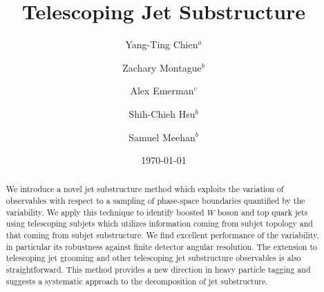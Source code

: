 \documentclass[aps,prl,floatfix,preprintnumbers,twocolumn,groupedaddress,nofootinbib]{revtex4-1}
\begin{document}
\title{Telescoping Jet Substructure}

\author{Yang-Ting Chien$^{a}$}

\author{Zachary Montague$^{b}$}

\author{Alex Emerman$^{c}$}

\author{Shih-Chieh Hsu$^b$}

\author{Samuel Meehan$^b$}


\date{\today}

\begin{abstract}
We introduce a novel jet substructure method which exploits the variation of observables with respect to a sampling of phase-space boundaries quantified by the variability. We apply this technique to identify boosted $W$ boson and top quark jets using telescoping subjets which utilizes information coming from subjet topology and that coming from subjet substructure. We find excellent performance of the variability, in particular its robustness against finite detector angular resolution. The extension to telescoping jet grooming and other telescoping jet substructure observables is also straightforward. This method provides a new direction in heavy particle tagging and suggests a systematic approach to the decomposition of jet substructure.
\end{abstract}
\maketitle
\end{document}
